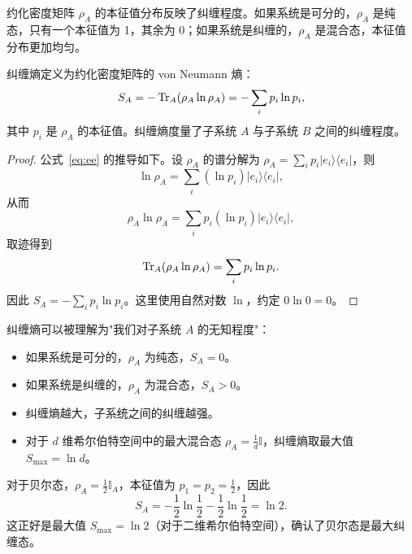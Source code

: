 约化密度矩阵 $\rho_A$ 的本征值分布反映了纠缠程度。如果系统是可分的，$\rho_A$ 是纯态，只有一个本征值为 1，其余为 0；如果系统是纠缠的，$\rho_A$ 是混合态，本征值分布更加均匀。

\begin{definition}[纠缠熵]\label{def:ee}
纠缠熵定义为约化密度矩阵的 von Neumann 熵：
\begin{equation}\label{eq:ee}
    S_A = -\Tr_A(\rho_A \ln \rho_A) = -\sum_i p_i \ln p_i,
\end{equation}
其中 $p_i$ 是 $\rho_A$ 的本征值。纠缠熵度量了子系统 $A$ 与子系统 $B$ 之间的纠缠程度。
\end{definition}

\begin{proof}
公式~\eqref{eq:ee} 的推导如下。设 $\rho_A$ 的谱分解为 $\rho_A = \sum_i p_i |e_i\rangle\langle e_i|$，则
\begin{equation}
    \ln \rho_A = \sum_i (\ln p_i) |e_i\rangle\langle e_i|,
\end{equation}
从而
\begin{equation}
    \rho_A \ln \rho_A = \sum_i p_i (\ln p_i) |e_i\rangle\langle e_i|,
\end{equation}
取迹得到
\begin{equation}
    \Tr_A(\rho_A \ln \rho_A) = \sum_i p_i \ln p_i.
\end{equation}
因此 $S_A = -\sum_i p_i \ln p_i$。这里使用自然对数 $\ln$，约定 $0 \ln 0 = 0$。
\end{proof}

\begin{note}[纠缠熵的物理意义]
纠缠熵可以被理解为"我们对子系统 $A$ 的无知程度"：
\begin{itemize}
    \item 如果系统是可分的，$\rho_A$ 为纯态，$S_A = 0$。
    \item 如果系统是纠缠的，$\rho_A$ 为混合态，$S_A > 0$。
    \item 纠缠熵越大，子系统之间的纠缠越强。
    \item 对于 $d$ 维希尔伯特空间中的最大混合态 $\rho_A = \frac{1}{d}\mathbb{I}$，纠缠熵取最大值 $S_{\max} = \ln d$。
\end{itemize}
\end{note}

\begin{example}[贝尔态的纠缠熵]
对于贝尔态，$\rho_A = \frac{1}{2}\mathbb{I}_A$，本征值为 $p_1 = p_2 = \frac{1}{2}$，因此
\begin{equation}
    S_A = -\frac{1}{2}\ln\frac{1}{2} - \frac{1}{2}\ln\frac{1}{2} = \ln 2.
\end{equation}
这正好是最大值 $S_{\max} = \ln 2$（对于二维希尔伯特空间），确认了贝尔态是最大纠缠态。
\end{example}

